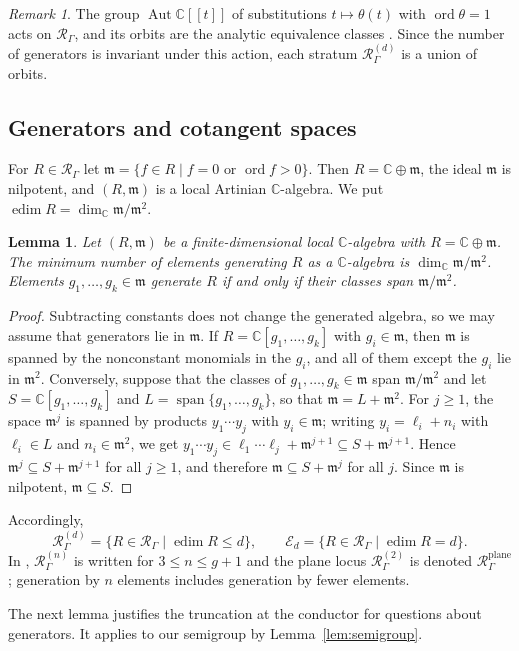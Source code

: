 \documentclass{amsart}
\newtheorem{lemma}[theorem]{Lemma}
\theoremstyle{definition}
\theoremstyle{remark}
\newtheorem{remark}[theorem]{Remark}
\numberwithin{equation}{section}
\newcommand{\CC}{\mathbb{C}}
\newcommand{\Rs}{\mathcal{R}_\Gamma}
\newcommand{\Rd}[1]{\mathcal{R}^{(#1)}_\Gamma}
\newcommand{\Ed}[1]{\mathcal{E}_{#1}}
\newcommand{\m}{\mathfrak{m}}
\newcommand{\ps}{[\![t]\!]}
\DeclareMathOperator{\ord}{ord}
\DeclareMathOperator{\edim}{edim}
\DeclareMathOperator{\Aut}{Aut}
\DeclareMathOperator{\spn}{span}
\begin{document}
\begin{remark}\label{rem:fixed-t}
The group $\Aut\CC\ps$ of substitutions $t\mapsto\theta(t)$ with $\ord\theta=1$ acts on $\Rs$, and its orbits are the analytic equivalence classes \cite[Section~4.3]{Ham20}. Since the number of generators is invariant under this action, each stratum $\Rd{d}$ is a union of orbits.
\end{remark}

\subsection{Generators and cotangent spaces}
For $R\in\Rs$ let $\m=\{f\in R\mid f=0\text{ or }\ord f>0\}$. Then $R=\CC\oplus\m$, the ideal $\m$ is nilpotent, and $(R,\m)$ is a local Artinian $\CC$-algebra. We put $\edim R=\dim_\CC\m/\m^2$.

\begin{lemma}\label{lem:nakayama}
Let $(R,\m)$ be a finite-dimensional local $\CC$-algebra with $R=\CC\oplus\m$. The minimum number of elements generating $R$ as a $\CC$-algebra is $\dim_\CC\m/\m^2$. Elements $g_1,\dots,g_k\in\m$ generate $R$ if and only if their classes span $\m/\m^2$.
\end{lemma}

\begin{proof}
Subtracting constants does not change the generated algebra, so we may assume that generators lie in $\m$. If $R=\CC[g_1,\dots,g_k]$ with $g_i\in\m$, then $\m$ is spanned by the nonconstant monomials in the $g_i$, and all of them except the $g_i$ lie in $\m^2$. Conversely, suppose that the classes of $g_1,\dots,g_k\in\m$ span $\m/\m^2$ and let $S=\CC[g_1,\dots,g_k]$ and $L=\spn\{g_1,\dots,g_k\}$, so that $\m=L+\m^2$. For $j\ge1$, the space $\m^j$ is spanned by products $y_1\cdots y_j$ with $y_i\in\m$; writing $y_i=\ell_i+n_i$ with $\ell_i\in L$ and $n_i\in\m^2$, we get $y_1\cdots y_j\in\ell_1\cdots\ell_j+\m^{j+1}\subseteq S+\m^{j+1}$. Hence $\m^j\subseteq S+\m^{j+1}$ for all $j\ge1$, and therefore $\m\subseteq S+\m^{j}$ for all $j$. Since $\m$ is nilpotent, $\m\subseteq S$.
\end{proof}

Accordingly,
\[
\Rd{d}=\{R\in\Rs\mid\edim R\le d\},\qquad \Ed{d}=\{R\in\Rs\mid\edim R=d\}.
\]
In \cite[Definition~4.4]{Ham20}, $\Rd{n}$ is written for $3\le n\le g+1$ and the plane locus $\Rd{2}$ is denoted $\mathcal{R}^{\mathrm{plane}}_\Gamma$; generation by $n$ elements includes generation by fewer elements.

The next lemma justifies the truncation at the conductor for questions about generators. It applies to our semigroup by Lemma~\ref{lem:semigroup}.
\end{document}
